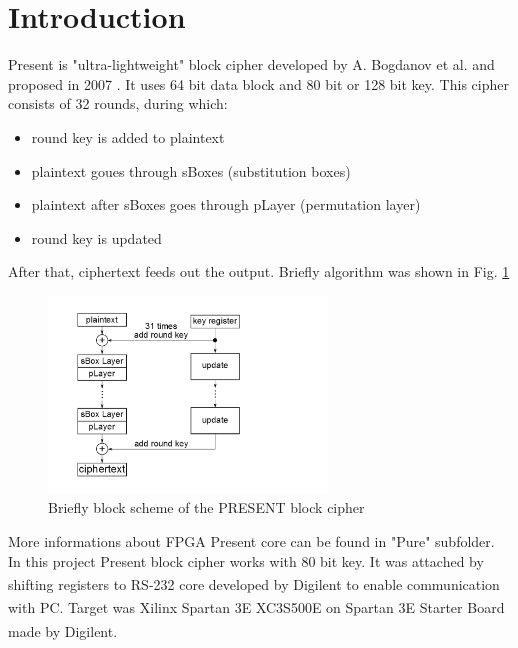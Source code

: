 \documentclass{gajewski}
\begin{document}
\maketitle

\newpage

\revisionTable

\newpage

\tableofcontents
\newpage

\section{Introduction}

Present is "ultra-lightweight" block cipher developed by A. Bogdanov et al. and proposed in 2007 \cite{PRESENT}. It uses 64 bit data block and 80 bit or 128 bit key.
This cipher consists of 32 rounds, during which: 
\begin{itemize}
    \item round key is added to plaintext
    \item plaintext goues through sBoxes (substitution boxes)
    \item plaintext after sBoxes goes through pLayer (permutation layer)
    \item round key is updated
\end{itemize}
After that, ciphertext feeds out the output. Briefly algorithm was shown in Fig. \ref{pAlgorithm}
\begin{figure}[!ht]%
    \begin{center}
    \includegraphics[width=0.66\textwidth]{img/presentAlgorithm.png}
    \caption{%
        Briefly block scheme of the PRESENT block cipher
     }%
    \label{pAlgorithm}
    \end{center}
 \end{figure}
More informations about FPGA Present core can be found in "Pure" subfolder.
In this project Present block cipher works with 80 bit key. It was attached by shifting registers to RS-232 core developed by Digilent\textsuperscript{\textregistered} to enable communication with PC. Target was Xilinx\textsuperscript{\textregistered} Spartan 3E XC3S500E \cite{Spartan} on Spartan 3E  Starter Board \cite{Digilent} made by Digilent\textsuperscript{\textregistered}.
\end{document}
